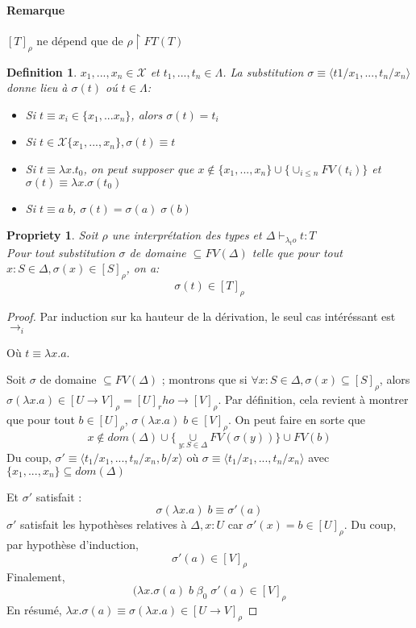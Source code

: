 \documentclass{article}
\newtheorem{prop}{Propriety}
\newtheorem{defi}{Definition}
\newcommand\lterm[2]{\lambda #1. #2}
\begin{document}
\paragraph{Remarque}
$[T]_\rho$ ne dépend que de $\rho \upharpoonright FT(T)$

\begin{defi}
$x_1,...,x_n \in \mathcal{X}$ et $t_1,...,t_n \in \Lambda$. La substitution $\sigma\equiv \langle t1/x_1,...,t_n/x_n\rangle$ donne lieu à $\sigma(t)$ oú $t\in \Lambda$:
\begin{itemize}[noitemsep,label=-]
\item Si $t\equiv x_i \in \{x_1,...x_n\}$, alors $\sigma(t)=t_i$
\item Si $t\in \mathcal{X}\{x_1,...,x_n\}, \sigma(t) \equiv t$
\item Si $t\equiv \lterm{x}{t_0}$, on peut supposer que 
$x\notin \{x_1,...,x_n\}\cup \{ \cup_{i\leq n}FV(t_i) \}$ 
et $\sigma (t) \equiv \lterm{x}{\sigma (t_0)}$
\item Si $t\equiv a\; b$, $\sigma(t)=\sigma(a)\; \sigma(b)$
\end{itemize}
\end{defi}

\begin{prop}
Soit $\rho$ une interprétation des types et $\Delta\vdash_{\lambda_to} t:T$\\
Pour tout substitution $\sigma$ de domaine $\subseteq FV(\Delta)$ telle que pour tout $x:S\in \Delta, \sigma (x) \in [S]_\rho$, on a:
\[\sigma ( t) \in [T]_\rho\]
\end{prop}
\begin{proof}
Par induction sur ka hauteur de la dérivation, le seul cas intéréssant est $\to_i$
\begin{prooftree}
\end{prooftree}
Où $t\equiv \lterm{x}{a}$.

Soit $\sigma$ de domaine $\subseteq FV(\Delta)$ ; montrons que si $\forall x : S \in \Delta, \sigma(x) \subseteq [S]_\rho$, alors $\sigma (\lterm{x}{a})\in [U\to V]_\rho = [U]_rho \to [V]_\rho$.
Par définition, cela revient à montrer que pour tout $b\in [U]_\rho$, $\sigma (\lterm{x}{a})\; b \in [V]_\rho$.
On peut faire en sorte que 
\[x\notin dom(\Delta) \cup \{ \underset{y:S\in \Delta}{\cup} FV(\sigma(y))\}\cup FV(b)\]
Du coup, $\sigma'\equiv \langle t_1/x_1,...,t_n/x_n,b/x\rangle$ où $\sigma \equiv \langle t_1/x_1,...,t_n/x_n\rangle$ avec $\{x_1,...,x_n\}\subseteq dom(\Delta)$

Et $\sigma'$ satisfait :
\[\sigma (\lterm{x}{a})\; b \equiv \sigma'(a)\]
$\sigma'$ satisfait les hypothèses relatives à $\Delta, x: U$ car $\sigma'(x)=b\in [U]_\rho$.
Du coup, par hypothèse d'induction,
\[\sigma'(a) \in [V]_\rho\]
Finalement,
\[(\lterm{x}{\sigma (a)}\; b \; \beta_0 \; \sigma' (a) \in [V]_\rho\]
En résumé, $\lterm{x}{\sigma (a)} \equiv \sigma (\lterm{x}{a}) \in [U\to V]_\rho$
\end{proof}
\end{document}

